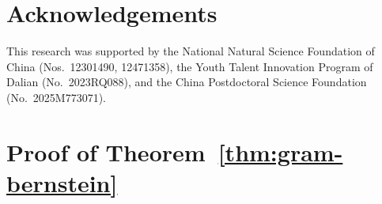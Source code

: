 \documentclass{jssc}
\begin{document}
\section*{Acknowledgements}
\label{sec:Acknowledgement}
This research was supported by the National Natural Science Foundation of China (Nos.~12301490, 12471358), the Youth Talent Innovation Program of Dalian (No.~2023RQ088), and the China Postdoctoral Science Foundation (No.~2025M773071).




\appendix
\section{Proof of Theorem~\ref{thm:gram-bernstein}}
\label{sec:appendix_A}
\end{document}
